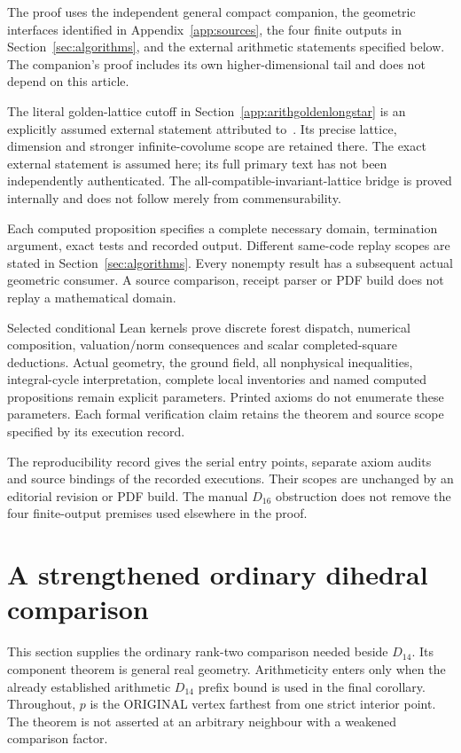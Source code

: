 \documentclass[11pt]{article}
\begin{document}
The proof uses the independent general compact companion, the
geometric interfaces identified in Appendix~\ref{app:sources}, the four
finite outputs in Section~\ref{sec:algorithms}, and the external
arithmetic statements specified below. The companion's proof includes
its own higher-dimensional tail and does not depend on this article.

The literal golden-lattice cutoff in
Section~\ref{app:arithgoldenlongstar} is an explicitly assumed external
statement attributed to~\cite{BugaenkoGolden1984}. Its precise lattice,
dimension and stronger infinite-covolume scope are retained there.
The exact external statement is assumed here; its full primary text
has not been independently authenticated. The all-compatible-invariant-lattice
bridge is proved internally and does not follow merely from commensurability.

Each computed proposition specifies a complete necessary domain,
termination argument, exact tests and recorded output. Different
same-code replay scopes are stated in Section~\ref{sec:algorithms}.
Every nonempty result has a subsequent actual geometric consumer.
A source comparison, receipt parser or PDF build does not replay a
mathematical domain.

Selected conditional Lean kernels prove discrete forest dispatch,
numerical composition, valuation/norm consequences and scalar
completed-square deductions. Actual geometry, the ground field,
all nonphysical inequalities, integral-cycle interpretation,
complete local inventories and named computed propositions remain
explicit parameters. Printed axioms do not enumerate these parameters.
Each formal verification claim retains the theorem and source scope
specified by its execution record.

The reproducibility record gives the serial entry points, separate
axiom audits and source bindings of the recorded executions. Their
scopes are unchanged by an editorial revision or PDF build. The manual
$D_{16}$ obstruction does not remove the four finite-output premises
used elsewhere in the proof.

\appendix
\section{A strengthened ordinary dihedral comparison}
\label{app:arithdihedral}

This section supplies the ordinary rank-two comparison needed beside
\(D_{14}\).  Its component theorem is general real geometry.
Arithmeticity enters only when the already established arithmetic
\(D_{14}\) prefix bound is used in the final corollary.
Throughout, \(p\) is the ORIGINAL vertex farthest from one strict
interior point.  The theorem is not asserted at an arbitrary
neighbour with a weakened comparison factor.
\end{document}
